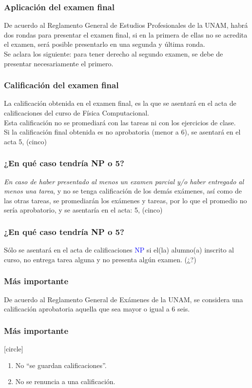 \documentclass[12pt]{beamer}
\newcommand{\textoazul}[1]{\textcolor{blue}{#1}}
\begin{document}
\begin{frame}
\frametitle{Aplicación del examen final}
De acuerdo al Reglamento General de Estudios Profesionales de la UNAM, habrá dos rondas para presentar el examen final, si en la primera de ellas no se acredita el examen, será posible presentarlo en una segunda y última ronda.
\\
\bigskip
\pause
Se aclara los siguiente: \alert{para tener derecho al segundo examen, se debe de presentar necesariamente el primero.}
\end{frame}
\begin{frame}
\frametitle{Calificación del examen final}
La calificación obtenida en el examen final, es la que se asentará en el acta de calificaciones del curso de Física Computacional.
\\
\bigskip
\pause
Esta calificación no se promediará con las tareas ni con los ejercicios de clase.
\\
\bigskip
\pause
Si la calificación final obtenida es no aprobatoria (menor a $6$), se asentará en el acta \alert{5, (cinco)}
\end{frame}
\begin{frame}
\frametitle{\textbf{¿En qué caso tendría NP o 5?}}
\emph{En caso de haber presentado al menos un examen parcial y/o haber entregado al menos una tarea}, y no se tenga calificación de los demás exámenes, así como de las otras tareas, se promediarán los exámenes y tareas, por lo que el promedio no sería aprobatorio, y se asentaría en el acta: \alert{5, (cinco)}
\end{frame}
\begin{frame}
\frametitle{\textbf{¿En qué caso tendría NP o 5?}}
Sólo se asentará en el acta de calificaciones \textoazul{NP} si el(la) alumno(a) inscrito al curso, no entrega tarea alguna y no presenta algún examen. (¿?)
\end{frame}
\begin{frame}
\frametitle{Más importante}
De acuerdo al Reglamento General de Exámenes de la UNAM, se considera una calificación aprobatoria aquella que sea mayor o igual a $6$ seis.
\end{frame}
\begin{frame}
\frametitle{Más importante}
[circle]
\begin{enumerate}[<+->]
\item No \enquote{se guardan calificaciones}.
\item No se renuncia a una calificación.
\end{enumerate}
\end{frame}
\end{document}
